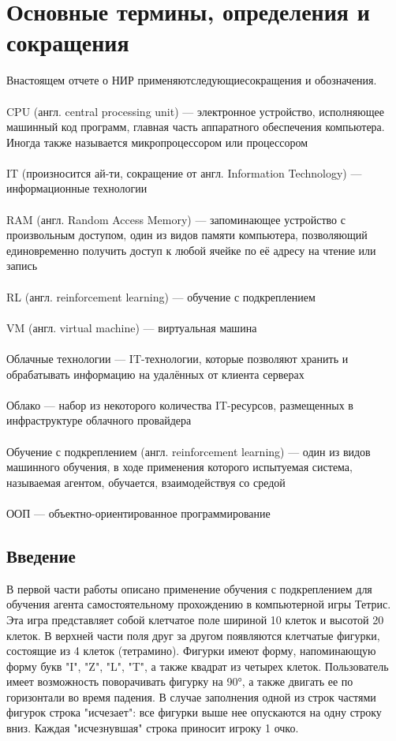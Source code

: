 \documentclass{article}
\begin{document}
\section {Основные термины, определения и сокращения}
Внастоящем отчете о НИР применяютследующиесокращения и обозначения.\\
~\\
CPU (англ. central processing unit) — электронное устройство, исполняющее машинный код программ, главная часть аппаратного обеспечения компьютера. Иногда также называется микропроцессором или процессором\\
~\\
IT (произносится ай-ти, сокращение от англ. Information Technology) — информационные технологии\\
~\\
RAM (англ. Random Access Memory) — запоминающее устройство с произвольным доступом, один из видов памяти компьютера, позволяющий единовременно получить доступ к любой ячейке по её адресу на чтение или запись\\
~\\
RL (англ. reinforcement learning) — обучение с подкреплением\\
~\\
VM (англ. virtual machine) — виртуальная машина\\
~\\
Облачные технологии — IT-технологии, которые позволяют хранить и обрабатывать информацию на удалённых от клиента серверах\\
~\\
Облако — набор из некоторого количества IT-ресурсов, размещенных в инфраструктуре облачного провайдера\\
~\\
Обучение с подкреплением (англ. reinforcement learning) — один из видов машинного обучения, в ходе применения которого испытуемая система, называемая агентом, обучается, взаимодействуя со средой\\
~\\
ООП — объектно-ориентированное программирование\\
\newpage
\begin{center}
\section {Введение}
\end{center}
В первой части работы описано применение обучения с подкреплением для обучения агента самостоятельному прохождению в компьютерной игры Тетрис\cite{litlink1}. Эта игра представляет собой клетчатое поле шириной 10 клеток и высотой 20 клеток. В верхней части поля друг за другом появляются клетчатые фигурки, состоящие из 4 клеток (тетрамино). Фигурки имеют форму, напоминающую форму букв "I", "Z", "L", "T", а также квадрат из четырех клеток. Пользователь имеет возможность поворачивать фигурку на 90°, а также двигать ее по горизонтали во время падения. В случае заполнения одной из строк частями фигурок строка "исчезает": все фигурки выше нее опускаются на одну строку вниз. Каждая "исчезнувшая" строка приносит игроку 1 очко.
\end{document}
